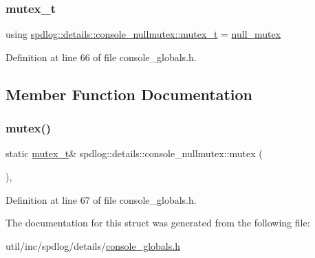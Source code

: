 \subsubsection{\texorpdfstring{mutex\+\_\+t}{mutex\_t}}
{\footnotesize\ttfamily using \hyperlink{structspdlog_1_1details_1_1console__nullmutex_a8464e2d02b3800061339841b94400da5}{spdlog\+::details\+::console\+\_\+nullmutex\+::mutex\+\_\+t} =  \hyperlink{structspdlog_1_1details_1_1null__mutex}{null\+\_\+mutex}}



Definition at line 66 of file console\+\_\+globals.\+h.



\subsection{Member Function Documentation}
\mbox{\label{structspdlog_1_1details_1_1console__nullmutex_a61016e82a5c02f104e04b58c53f8c95d}} 
\subsubsection{\texorpdfstring{mutex()}{mutex()}}
{\footnotesize\ttfamily static \hyperlink{structspdlog_1_1details_1_1console__nullmutex_a8464e2d02b3800061339841b94400da5}{mutex\+\_\+t}\& spdlog\+::details\+::console\+\_\+nullmutex\+::mutex (\begin{DoxyParamCaption}{ }\end{DoxyParamCaption})\hspace{0.3cm}{\ttfamily [inline]}, {\ttfamily [static]}}



Definition at line 67 of file console\+\_\+globals.\+h.



The documentation for this struct was generated from the following file\+:\begin{DoxyCompactItemize}
\item 
util/inc/spdlog/details/\hyperlink{console__globals_8h}{console\+\_\+globals.\+h}\end{DoxyCompactItemize}
